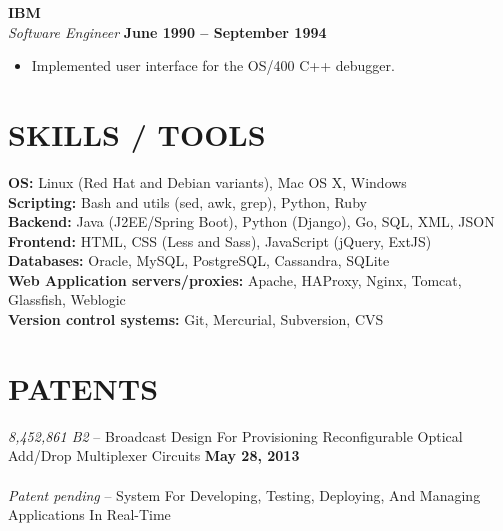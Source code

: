 \documentclass[margin,line]{resume}
\begin{document}
\begin{resume}
    \textbf{\listing IBM} \vspace{2mm}\\\vspace{1mm}%
    \textsl{Software Engineer} \hfill \textbf{June 1990 -- September 1994}\\
    \begin{itemize}
        \item Implemented user interface for the OS/400 C++ debugger.
    \end{itemize}
    

    \vspace{32mm}

\sectionline

    \section{\mysidestyle \textbf{\large{S}\small{KILLS} / \large{T}\small{OOLS}}}
    \textbf{OS:} Linux (Red Hat and Debian variants), Mac OS X, Windows \\
    \textbf{Scripting:} Bash and utils (sed, awk, grep), Python, Ruby\\
    \textbf{Backend:} Java (J2EE/Spring Boot), Python (Django), Go, SQL, XML, JSON\\
    \textbf{Frontend:} HTML, CSS (Less and Sass), JavaScript (jQuery, ExtJS)\\
    \textbf{Databases:} Oracle, MySQL, PostgreSQL, Cassandra, SQLite\\
    \textbf{Web Application servers/proxies:} Apache, HAProxy, Nginx, Tomcat, Glassfish, Weblogic\\
    \textbf{Version control systems:} Git, Mercurial, Subversion, CVS\\

\sectionline

    \section{\mysidestyle \textbf{\large{P}\small{ATENTS}}}
    \textsl{8,452,861 B2} -- Broadcast Design For Provisioning Reconfigurable Optical Add/Drop Multiplexer Circuits \hfill \textbf{May 28, 2013}\\\\
    \textsl{Patent pending} -- System For Developing, Testing, Deploying, And Managing Applications In Real-Time\\
    \vspace{-4mm}


\end{resume}
\end{document}
